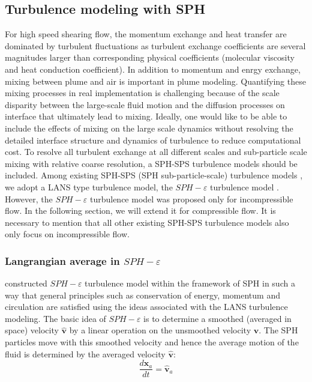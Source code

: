 \documentclass[gmd, manuscript]{copernicus}
\begin{document}
\subsection{Turbulence modeling with SPH}
For high speed shearing flow, the momentum exchange and heat transfer are dominated by turbulent fluctuations as turbulent exchange coefficients are several magnitudes larger than corresponding physical coefficients (molecular viscosity and heat conduction coefficient). In addition to momentum and enrgy exchange, mixing between plume and air is important in plume modeling. Quantifying these mixing processes in real implementation is challenging because of the scale disparity between the large-scale fluid motion and the diffusion processes on interface that ultimately lead to mixing. Ideally, one would like to be able to include the effects of mixing on the large scale dynamics without resolving the detailed interface structure and dynamics of turbulence to reduce computational cost.
To resolve all turbulent exchange at all different scales and sub-particle scale mixing with relative coarse resolution, a SPH-SPS turbulence models should be included. Among existing SPH-SPS (SPH sub-particle-scale) turbulence models \citep{holm1999fluctuation, monaghan2002sph, violeau2007numerical, monaghan2011turbulence}, we adopt a LANS type turbulence model, the $SPH-\varepsilon$ turbulence model \citep{monaghan2011turbulence}. However, the $SPH-\varepsilon$ turbulence model was proposed only for incompressible flow. In the following section, we will extend it for compressible flow. It is necessary to mention that all other existing SPH-SPS turbulence models \citep{holm1999fluctuation, monaghan2002sph, violeau2007numerical} also only focus on incompressible flow.

\subsubsection{Langrangian average in $SPH-\varepsilon$}
\citet{monaghan2011turbulence} constructed $SPH-\varepsilon$ turbulence model within the framework of SPH in such a way that general principles such as conservation of energy, momentum and circulation are satisfied using the ideas associated with the LANS turbulence modeling. The basic idea of $SPH-\varepsilon$ is to determine a smoothed (averaged in space) velocity $\widehat{\textbf{v}}$ by a linear operation on the unsmoothed velocity $\textbf{v}$. The SPH particles move with this smoothed velocity and hence the average motion of the fluid is determined by the averaged velocity $\widehat{\textbf{v}}$:
\begin{equation}
\dfrac{d \textbf{x}_a}{dt} = \widehat{\textbf{v}}_a \label{eq:gov-update-pos-turbulence}
\end{equation}
\end{document}
